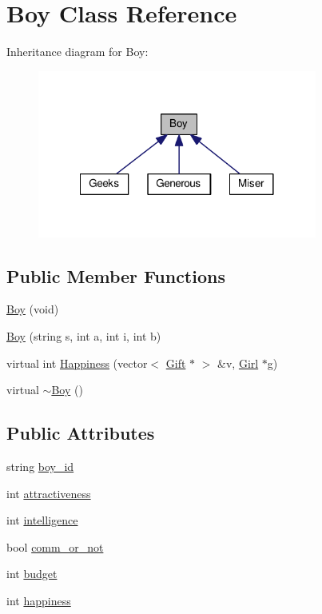 \hypertarget{class_boy}{\section{Boy Class Reference}
\label{class_boy}
}


Inheritance diagram for Boy\-:
\nopagebreak
\begin{figure}[H]
\begin{center}
\leavevmode
\includegraphics[width=260pt]{class_boy__inherit__graph}
\end{center}
\end{figure}
\subsection*{Public Member Functions}
\begin{DoxyCompactItemize}
\item 
\hyperlink{class_boy_aae13c6cc1000dc03c11daac53656081a}{Boy} (void)
\item 
\hyperlink{class_boy_a8ff8bba98c8eb44793e96ae65a242aaf}{Boy} (string s, int a, int i, int b)
\item 
virtual int \hyperlink{class_boy_abcbc735ebf66289a31d0487e0dc52184}{Happiness} (vector$<$ \hyperlink{class_gift}{Gift} $\ast$ $>$ \&v, \hyperlink{class_girl}{Girl} $\ast$g)
\item 
virtual \hyperlink{class_boy_ae9fa56e7e1d3d4433e64161e28dd4b8e}{$\sim$\-Boy} ()
\end{DoxyCompactItemize}
\subsection*{Public Attributes}
\begin{DoxyCompactItemize}
\item 
string \hyperlink{class_boy_a8a3bba4d4570b1e9d43a1f0c6a1eb7ed}{boy\-\_\-id}
\item 
int \hyperlink{class_boy_a679e59279116986aaae135d8a524bc46}{attractiveness}
\item 
int \hyperlink{class_boy_a10f24ab1e3dbee6fac2a122c76954fa5}{intelligence}
\item 
bool \hyperlink{class_boy_a20bb3ae9a27e23227249cff68b0458e3}{comm\-\_\-or\-\_\-not}
\item 
int \hyperlink{class_boy_a3b755250e77f892967872c7eb4c26685}{budget}
\item 
int \hyperlink{class_boy_adaf15f15972678dbd77e8b8b319d5767}{happiness}
\end{DoxyCompactItemize}


